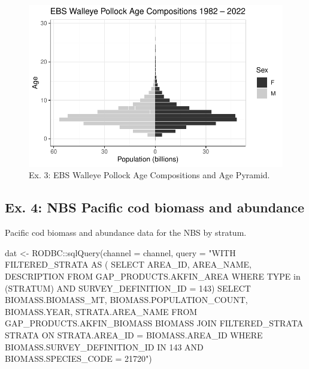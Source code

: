\documentclass[
  letterpaper,
  oneside,
  open=any]{scrbook}
\newenvironment{Shaded}{\begin{snugshade}}{\end{snugshade}}
\newcommand{\AttributeTok}[1]{\textcolor[rgb]{0.40,0.45,0.13}{#1}}
\newcommand{\FunctionTok}[1]{\textcolor[rgb]{0.28,0.35,0.67}{#1}}
\newcommand{\NormalTok}[1]{\textcolor[rgb]{0.00,0.23,0.31}{#1}}
\newcommand{\OtherTok}[1]{\textcolor[rgb]{0.00,0.23,0.31}{#1}}
\newcommand{\SpecialCharTok}[1]{\textcolor[rgb]{0.37,0.37,0.37}{#1}}
\newcommand{\StringTok}[1]{\textcolor[rgb]{0.13,0.47,0.30}{#1}}
\begin{document}
\begin{figure}[H]

{\centering \includegraphics{content/akfin-oracle-sql-r_files/figure-pdf/test-3-plot-1.pdf}

}

\caption{Ex. 3: EBS Walleye Pollock Age Compositions and Age Pyramid.}

\end{figure}

\hypertarget{ex.-4-nbs-pacific-cod-biomass-and-abundance}{%
\subsection{Ex. 4: NBS Pacific cod biomass and
abundance}\label{ex.-4-nbs-pacific-cod-biomass-and-abundance}}

Pacific cod biomass and abundance data for the NBS by stratum.

\begin{Shaded}
\begin{Highlighting}[]
\NormalTok{dat }\OtherTok{\textless{}{-}}\NormalTok{ RODBC}\SpecialCharTok{::}\FunctionTok{sqlQuery}\NormalTok{(}\AttributeTok{channel =}\NormalTok{ channel, }
                       \AttributeTok{query =} 
\StringTok{"WITH FILTERED\_STRATA AS (}
\StringTok{SELECT }
\StringTok{AREA\_ID, }
\StringTok{AREA\_NAME, }
\StringTok{DESCRIPTION }
\StringTok{FROM GAP\_PRODUCTS.AKFIN\_AREA}
\StringTok{WHERE TYPE in (\textquotesingle{}STRATUM\textquotesingle{}) AND }
\StringTok{SURVEY\_DEFINITION\_ID = 143) }
\StringTok{SELECT }
\StringTok{BIOMASS.BIOMASS\_MT, }
\StringTok{BIOMASS.POPULATION\_COUNT, }
\StringTok{BIOMASS.YEAR, }
\StringTok{STRATA.AREA\_NAME}
\StringTok{FROM GAP\_PRODUCTS.AKFIN\_BIOMASS BIOMASS }
\StringTok{JOIN FILTERED\_STRATA STRATA }
\StringTok{ON STRATA.AREA\_ID = BIOMASS.AREA\_ID}
\StringTok{WHERE BIOMASS.SURVEY\_DEFINITION\_ID IN 143 }
\StringTok{AND BIOMASS.SPECIES\_CODE = 21720"}\NormalTok{)}
\end{Highlighting}
\end{Shaded}
\end{document}

